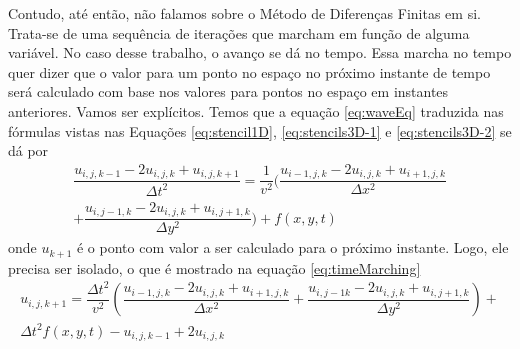 	
	Contudo, até então, não falamos sobre o Método de Diferenças Finitas 
	em si. Trata-se de uma sequência de iterações que marcham em função de
	alguma variável. No caso desse trabalho, o avanço se dá no tempo. Essa marcha 
	no tempo quer dizer que o valor para um ponto no espaço no próximo instante de 
	tempo será calculado com base nos valores para pontos no espaço em instantes 
	anteriores. Vamos ser explícitos. Temos que a equação \ref{eq:waveEq} traduzida 
	nas fórmulas vistas nas Equações 
	\ref{eq:stencil1D}, \ref{eq:stencils3D-1} e \ref{eq:stencils3D-2} se dá por
	\begin{equation}
    	\begin{split}
    		 \dfrac{u_{i,j,k-1} - 2u_{i,j,k} + u_{i,j,k+1}}{\Delta t^2} = \dfrac{1}{v^2}(\dfrac{u_{i-1,j,k} - 2u_{i,j,k} + u_{i+1,j,k}}{\Delta x^2} \\+ \dfrac{u_{i,j-1,k} - 2u_{i,j,k} + u_{i,j+1,k}}{\Delta y^2}) + f(x, y, t)
    	\end{split}
	\end{equation}
	onde $u_{k+1}$ é o ponto com valor a ser calculado para o próximo
	instante. Logo, ele precisa ser isolado, o que é mostrado na equação 
	\ref{eq:timeMarching}
	\begin{equation}
    	\begin{split}
    		\label{eq:timeMarching}
    		u_{i, j,k+1} = \dfrac{\Delta t^2}{v^2} \left(\dfrac{u_{i-1,j,k} - 2u_{i,j,k} + u_{i+1,j,k}}{\Delta x^2} + \dfrac{u_{i,j-1k} - 2u_{i,j,k} + u_{i,j+1,k}}{\Delta y^2}\right) + \\\Delta t^2f(x, y, t) - u_{i,j,k-1} + 2u_{i,j,k}
    	\end{split}
    \end{equation}